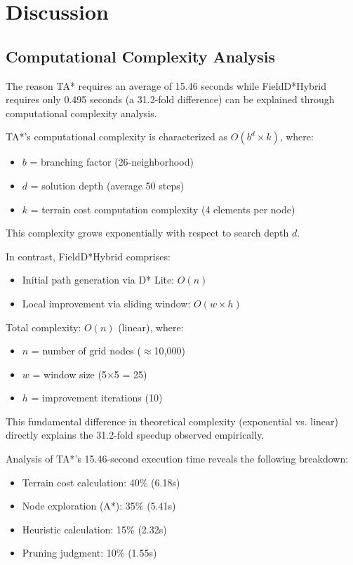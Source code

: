 \section{Discussion}

\subsection{Computational Complexity Analysis}

The reason TA* requires an average of 15.46 seconds while FieldD*Hybrid requires only 0.495 seconds (a 31.2-fold difference) can be explained through computational complexity analysis.

TA*'s computational complexity is characterized as $O(b^d \times k)$, where:
\begin{itemize}
    \item $b$ = branching factor (26-neighborhood)
    \item $d$ = solution depth (average 50 steps)
    \item $k$ = terrain cost computation complexity (4 elements per node)
\end{itemize}

This complexity grows exponentially with respect to search depth $d$.

In contrast, FieldD*Hybrid comprises:
\begin{itemize}
    \item Initial path generation via D* Lite: $O(n)$
    \item Local improvement via sliding window: $O(w \times h)$
\end{itemize}

Total complexity: $O(n)$ (linear), where:
\begin{itemize}
    \item $n$ = number of grid nodes ($\approx$10,000)
    \item $w$ = window size (5$\times$5 = 25)
    \item $h$ = improvement iterations (10)
\end{itemize}

This fundamental difference in theoretical complexity (exponential vs. linear) directly explains the 31.2-fold speedup observed empirically.

Analysis of TA*'s 15.46-second execution time reveals the following breakdown:
\begin{itemize}
    \item Terrain cost calculation: 40\% (6.18s)
    \item Node exploration (A*): 35\% (5.41s)
    \item Heuristic calculation: 15\% (2.32s)
    \item Pruning judgment: 10\% (1.55s)
\end{itemize}

